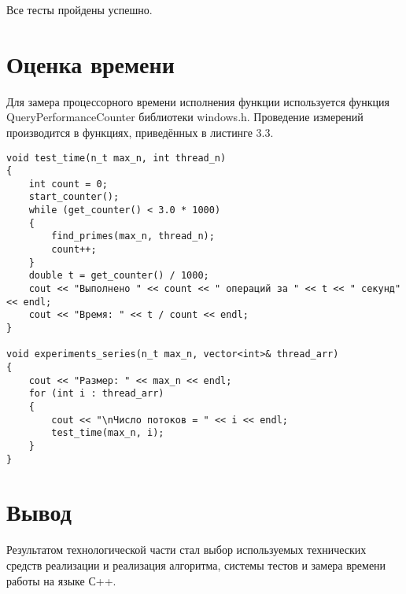 Все тесты пройдены успешно.

\section{Оценка времени}
Для замера процессорного времени исполнения функции используется функция QueryPerformanceCounter библиотеки windows.h\cite{QueryPerformanceCounter}. Проведение измерений производится в функциях, приведённых в листинге 3.3.

\begin{lstlisting}[caption = Функции замера процессорного времени работы функции]
void test_time(n_t max_n, int thread_n)
{
	int count = 0;
	start_counter();
	while (get_counter() < 3.0 * 1000)
	{
		find_primes(max_n, thread_n);
		count++;
	}
	double t = get_counter() / 1000;
	cout << "Выполнено " << count << " операций за " << t << " секунд" << endl;
	cout << "Время: " << t / count << endl;
}

void experiments_series(n_t max_n, vector<int>& thread_arr)
{
	cout << "Размер: " << max_n << endl;
	for (int i : thread_arr)
	{
		cout << "\nЧисло потоков = " << i << endl;
		test_time(max_n, i);
	}
}
\end{lstlisting}

\section*{Вывод}
Результатом технологической части стал выбор используемых технических средств реализации и реализация алгоритма, системы тестов и замера времени работы на языке С++.
